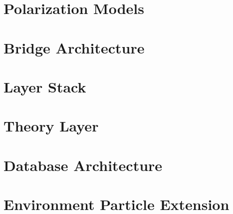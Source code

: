 \documentclass[11pt, letterpaper, oneside]{report}
\begin{document}
\chapter{Polarization Models}
\label{ch:polar}


\chapter{Bridge Architecture}
\label{ch:bridge}


\chapter{Layer Stack}
\label{ch:layerstack}


\chapter{Theory Layer}
\label{ch:theorylayer}


\chapter{Database Architecture}
\label{ch:database}


\chapter{Environment Particle Extension}
\label{ch:envpart}

\end{document}
